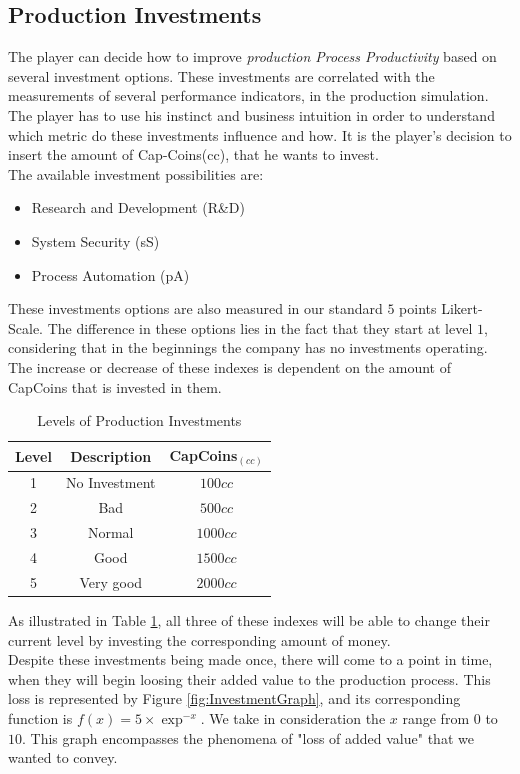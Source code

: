 \subsection{Production Investments}
The player can decide how to improve \textit{production Process Productivity} based on several investment options. These investments are correlated with the measurements of several performance indicators, in the production simulation. The player has to use his instinct and business intuition in order to understand which metric do these investments influence and how. It is the player's decision to insert the amount of Cap-Coins(cc), that he wants to invest. \\
The available investment possibilities are:
\begin{itemize}
\item Research and Development (R\&D)
\item System Security (sS)
\item Process Automation (pA)
\end{itemize}
These investments options are also measured in our standard $5$ points Likert-Scale. The difference in these options lies in the fact that they start at level $1$, considering that in the beginnings the company has no investments operating. The increase or decrease of these indexes is dependent on the amount of CapCoins that is invested in them.

\begin{table}[ht]
\centering
\begin{tabular}{c|c|c}
\hline
 Level & Description & CapCoins$_{(cc)}$\\
\hline \hline
 1 & No Investment & $100cc$ \\
 2 & Bad & $ 500cc$\\
 3 & Normal & $1000cc$ \\
 4 & Good & $1500cc$ \\
 5 & Very good & $2000cc$\\
\hline
\end{tabular}
\caption{Levels of Production Investments}
\label{table:prod-investments}
\end{table}
As illustrated in Table \ref{table:prod-investments}, all three of these indexes will be able to change their current level by investing the corresponding amount of money.\\
Despite these investments being made once, there will come to a point in time, when they will begin loosing their added value to the production process. This loss is represented by Figure \ref{fig:InvestmentGraph}, and its corresponding function is $f(x)=5\times\exp^{-x}$. We take in consideration the $x$ range from $0$ to $10$. This graph encompasses the phenomena of "loss of added value" that we wanted to convey.

